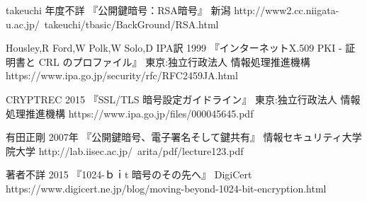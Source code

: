 \begin{thebibliography}{99}
\item
	takeuchi
	年度不詳
	『公開鍵暗号：RSA暗号』
	新潟
	http://www2.cc.niigata-u.ac.jp/~takeuchi/tbasic/BackGround/RSA.html
\item
	Housley,R Ford,W Polk,W Solo,D
	IPA訳
	1999
	『インターネットX.509 PKI - 証明書と CRL のプロファイル』
	東京:独立行政法人 情報処理推進機構
	https://www.ipa.go.jp/security/rfc/RFC2459JA.html	
\item
	CRYPTREC
	2015
	『SSL/TLS 暗号設定ガイドライン』
	東京:独立行政法人 情報処理推進機構
	https://www.ipa.go.jp/files/000045645.pdf
\item
	有田正剛
	2007年
	『公開鍵暗号、電子署名そして鍵共有』
	情報セキュリティ大学院大学
	http://lab.iisec.ac.jp/~arita/pdf/lecture123.pdf
\item
	著者不詳
	2015
	『1024-ｂｉt 暗号のその先へ』
	DigiCert
	https://www.digicert.ne.jp/blog/moving-beyond-1024-bit-encryption.html
\end{thebibliography}